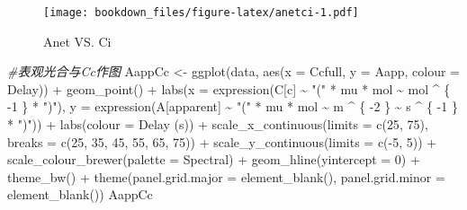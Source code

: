 \documentclass[
]{krantz}
\makeatletter
\newenvironment{Shaded}{\begin{snugshade}}{\end{snugshade}}
\newcommand{\AttributeTok}[1]{\textcolor[rgb]{0.77,0.63,0.00}{#1}}
\newcommand{\CommentTok}[1]{\textcolor[rgb]{0.56,0.35,0.01}{\textit{#1}}}
\newcommand{\DecValTok}[1]{\textcolor[rgb]{0.00,0.00,0.81}{#1}}
\newcommand{\FunctionTok}[1]{\textcolor[rgb]{0.00,0.00,0.00}{#1}}
\newcommand{\NormalTok}[1]{#1}
\newcommand{\OtherTok}[1]{\textcolor[rgb]{0.56,0.35,0.01}{#1}}
\newcommand{\SpecialCharTok}[1]{\textcolor[rgb]{0.00,0.00,0.00}{#1}}
\newcommand{\StringTok}[1]{\textcolor[rgb]{0.31,0.60,0.02}{#1}}
\newenvironment{kframe}{%
\medskip{}
\setlength{\fboxsep}{.8em}
 \def\at@end@of@kframe{}%
 \ifinner\ifhmode%
  \def\at@end@of@kframe{\end{minipage}}%
  \begin{minipage}{\columnwidth}%
 \fi\fi%
 \def\FrameCommand##1{\hskip\@totalleftmargin \hskip-\fboxsep
 \colorbox{shadecolor}{##1}\hskip-\fboxsep
     \hskip-\linewidth \hskip-\@totalleftmargin \hskip\columnwidth}%
 \MakeFramed {\advance\hsize-\width
   \@totalleftmargin\z@ \linewidth\hsize
   \@setminipage}}%
 {\par\unskip\endMakeFramed%
 \at@end@of@kframe}
\renewenvironment{Shaded}{\begin{kframe}}{\end{kframe}}
\makeatother
\begin{document}
\begin{figure}
\centering
\texttt{[image: bookdown\_files/figure-latex/anetci-1.pdf]}
\caption{\label{fig:anetci}Anet VS. Ci}
\end{figure}

\begin{Shaded}
\begin{Highlighting}[]
\CommentTok{\#表观光合与Cc作图}
\NormalTok{AappCc }\OtherTok{\textless{}{-}} \FunctionTok{ggplot}\NormalTok{(data, }\FunctionTok{aes}\NormalTok{(}\AttributeTok{x =}\NormalTok{ Ccfull, }\AttributeTok{y =}\NormalTok{ Aapp, }\AttributeTok{colour =}\NormalTok{ Delay)) }\SpecialCharTok{+}
  \FunctionTok{geom\_point}\NormalTok{() }\SpecialCharTok{+}
  \FunctionTok{labs}\NormalTok{(}\AttributeTok{x =} \FunctionTok{expression}\NormalTok{(C[c] }\SpecialCharTok{\textasciitilde{}} \StringTok{"("} \SpecialCharTok{*}\NormalTok{ mu }\SpecialCharTok{*}\NormalTok{ mol }\SpecialCharTok{\textasciitilde{}}\NormalTok{ mol }\SpecialCharTok{\^{}}\NormalTok{ \{}
    \SpecialCharTok{{-}}\DecValTok{1}
\NormalTok{  \} }\SpecialCharTok{*} \StringTok{")"}\NormalTok{),}
  \AttributeTok{y =} \FunctionTok{expression}\NormalTok{(A[apparent] }\SpecialCharTok{\textasciitilde{}} \StringTok{"("} \SpecialCharTok{*}\NormalTok{ mu }\SpecialCharTok{*}\NormalTok{ mol }\SpecialCharTok{\textasciitilde{}}\NormalTok{ m }\SpecialCharTok{\^{}}\NormalTok{ \{}
    \SpecialCharTok{{-}}\DecValTok{2}
\NormalTok{  \} }\SpecialCharTok{\textasciitilde{}}\NormalTok{ s }\SpecialCharTok{\^{}}\NormalTok{ \{}
    \SpecialCharTok{{-}}\DecValTok{1}
\NormalTok{  \} }\SpecialCharTok{*} \StringTok{")"}\NormalTok{)) }\SpecialCharTok{+}
  \FunctionTok{labs}\NormalTok{(}\AttributeTok{colour =} \StringTok{\textquotesingle{}Delay (s)\textquotesingle{}}\NormalTok{) }\SpecialCharTok{+}
  \FunctionTok{scale\_x\_continuous}\NormalTok{(}\AttributeTok{limits =} \FunctionTok{c}\NormalTok{(}\DecValTok{25}\NormalTok{, }\DecValTok{75}\NormalTok{),}
                     \AttributeTok{breaks =} \FunctionTok{c}\NormalTok{(}\DecValTok{25}\NormalTok{, }\DecValTok{35}\NormalTok{, }\DecValTok{45}\NormalTok{, }\DecValTok{55}\NormalTok{, }\DecValTok{65}\NormalTok{, }\DecValTok{75}\NormalTok{)) }\SpecialCharTok{+}
  \FunctionTok{scale\_y\_continuous}\NormalTok{(}\AttributeTok{limits =} \FunctionTok{c}\NormalTok{(}\SpecialCharTok{{-}}\DecValTok{5}\NormalTok{, }\DecValTok{5}\NormalTok{)) }\SpecialCharTok{+}
  \FunctionTok{scale\_colour\_brewer}\NormalTok{(}\AttributeTok{palette =} \StringTok{\textquotesingle{}Spectral\textquotesingle{}}\NormalTok{) }\SpecialCharTok{+}
  \FunctionTok{geom\_hline}\NormalTok{(}\AttributeTok{yintercept =} \DecValTok{0}\NormalTok{) }\SpecialCharTok{+}
  \FunctionTok{theme\_bw}\NormalTok{() }\SpecialCharTok{+}
  \FunctionTok{theme}\NormalTok{(}\AttributeTok{panel.grid.major =} \FunctionTok{element\_blank}\NormalTok{(),}
        \AttributeTok{panel.grid.minor =} \FunctionTok{element\_blank}\NormalTok{())}
\NormalTok{AappCc}
\end{Highlighting}
\end{Shaded}
\end{document}
